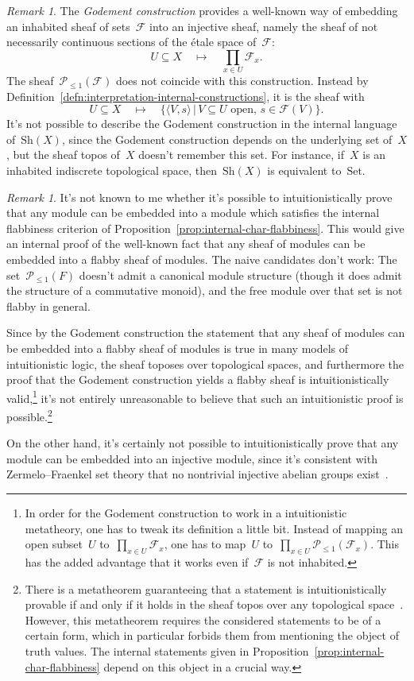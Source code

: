 \documentclass[10pt,reqno,a4paper]{amsbook}
\theoremstyle{definition}
\theoremstyle{plain}
\theoremstyle{remark}
\newtheorem{rem}[defn]{Remark}
\newcommand{\F}{\mathcal{F}}
\renewcommand{\P}{\mathcal{P}}
\newcommand{\Set}{\mathrm{Set}}
\newcommand{\Sh}{\mathrm{Sh}}
\newcommand{\?}{\,{:}\,}
\renewcommand{\_}{\mathpunct{.}\,}
\begin{document}
\begin{rem}\label{rem:godement-construction}
The \emph{Godement construction} provides a well-known way of embedding an
inhabited sheaf of sets~$\F$ into an injective sheaf, namely
the sheaf of not necessarily continuous sections of the étale space of~$\F$:
\[ U \subseteq X \quad\longmapsto\quad
  \prod_{x \in U} \F_x. \]
The sheaf~$\P_{\leq1}(\F)$ does not coincide with this construction.
Instead by Definition~\ref{defn:interpretation-internal-constructions}, it is the sheaf with
\[ U \subseteq X \quad\longmapsto\quad
  \{ \langle V, s \rangle \,|\,
    \text{$V \subseteq U$ open, $s \in \F(V)$} \}. \]
It's not possible to describe the Godement construction in the internal language
of~$\Sh(X)$, since the Godement construction depends on the underlying set of~$X$,
but the sheaf topos of~$X$ doesn't remember this set. For instance, if~$X$
is an inhabited indiscrete topological space, then~$\Sh(X)$ is equivalent
to~$\Set$.
\end{rem}

\begin{rem}It's not known to me whether it's possible to intuitionistically
prove that any module can be embedded into a module which satisfies the internal
flabbiness criterion of Proposition~\ref{prop:internal-char-flabbiness}. This
would give an internal proof of the well-known fact that any sheaf of modules can be embedded into a
flabby sheaf of modules. The naive candidates don't work: The
set~$\P_{\leq1}(F)$ doesn't admit a canonical module structure (though it does admit the structure of a commutative monoid), and the free
module over that set is not flabby in general.

Since by the Godement construction the statement that any sheaf of modules can
be embedded into a flabby sheaf of modules is true in many models of
intuitionistic logic, the sheaf toposes over topological spaces, and
furthermore the proof that the Godement construction yields a flabby sheaf is
intuitionistically valid,\footnote{In order for the Godement construction to
work in a intuitionistic metatheory, one has to tweak its definition a little
bit. Instead of mapping an open subset~$U$ to~$\prod_{x \in U} \F_x$, one has
to map~$U$ to~$\prod_{x \in U} \P_{\leq1}(\F_x)$. This has the added advantage
that it works even if~$\F$ is not inhabited.} it's not entirely unreasonable to believe
that such an intuitionistic proof is possible.\footnote{There is a metatheorem
guaranteeing that a statement is intuitionistically provable if and only if it
holds in the sheaf topos over any topological
space~\cite[Theorem~B]{awodey-butz:completeness}. However, this metatheorem
requires the considered statements to be of a certain form, which in particular
forbids them from mentioning the object of truth values. The internal
statements given in Proposition~\ref{prop:internal-char-flabbiness} depend on
this object in a crucial way.}

On the other hand, it's certainly not possible to intuitionistically prove that
any module can be embedded into an injective module, since it's consistent with
Zermelo--Fraenkel set theory that no nontrivial injective abelian groups
exist~\cite{blass:inj-proj-axc}.
\end{rem}
\end{document}
